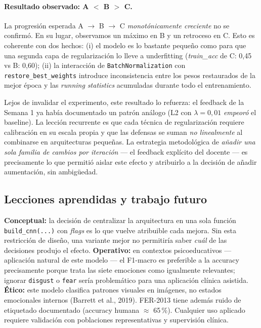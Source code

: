 \documentclass[10pt,a4paper,twocolumn]{article}
\begin{document}
\paragraph{Resultado observado: A $<$ B $>$ C.} La progresión esperada A $\rightarrow$ B $\rightarrow$ C \textit{monotónicamente creciente} no se confirmó. En su lugar, observamos un máximo en B y un retroceso en C. Esto es coherente con dos hechos: (i) el modelo es lo bastante pequeño como para que una segunda capa de regularización lo lleve a underfitting (\textit{train\_acc} de C: 0,45 vs B: 0,60); (ii) la interacción de \texttt{BatchNormalization} con \texttt{restore\_best\_weights} introduce inconsistencia entre los pesos restaurados de la mejor época y las \textit{running statistics} acumuladas durante todo el entrenamiento.

Lejos de invalidar el experimento, este resultado lo refuerza: el feedback de la Semana 1 ya había documentado un patrón análogo (L2 con $\lambda=0,01$ \textit{empeoró} el baseline). La lección recurrente es que cada técnica de regularización requiere calibración en su escala propia y que las defensas se suman \textit{no linealmente} al combinarse en arquitecturas pequeñas. La estrategia metodológica de \textit{añadir una sola familia de cambios por iteración} --- el feedback explícito del docente --- es precisamente lo que permitió aislar este efecto y atribuirlo a la decisión de añadir aumentación, sin ambigüedad.

\subsection{Lecciones aprendidas y trabajo futuro}

\textbf{Conceptual:} la decisión de centralizar la arquitectura en una sola función \texttt{build\_cnn(...)} con \textit{flags} es lo que vuelve atribuible cada mejora. Sin esta restricción de diseño, una variante mejor no permitiría saber \textit{cuál} de las decisiones produjo el efecto. \textbf{Operativo:} en contextos psicoeducativos --- aplicación natural de este modelo --- el F1-macro es preferible a la accuracy precisamente porque trata las siete emociones como igualmente relevantes; ignorar \texttt{disgust} o \texttt{fear} sería problemático para una aplicación clínica asistida. \textbf{Ético:} este modelo clasifica patrones visuales en imágenes, no estados emocionales internos (Barrett et al., 2019). FER-2013 tiene además ruido de etiquetado documentado (accuracy humana $\approx$ 65\,\%). Cualquier uso aplicado requiere validación con poblaciones representativas y supervisión clínica.
\end{document}
